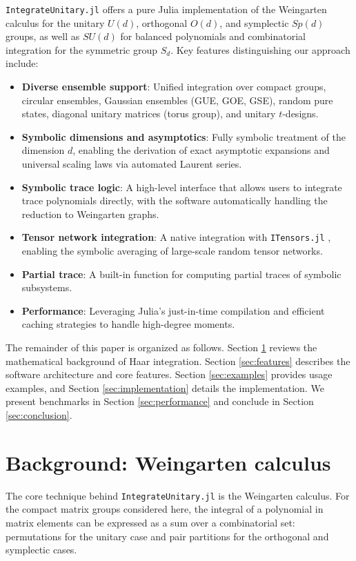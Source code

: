 \documentclass[manuscript,screen]{acmart}
\begin{document}
\texttt{IntegrateUnitary.jl} offers a pure Julia implementation of the Weingarten calculus
for the unitary $U(d)$, orthogonal $O(d)$, and
symplectic $Sp(d)$ groups, as well as $SU(d)$ for balanced polynomials and
combinatorial integration for the symmetric group $S_d$. Key features distinguishing our approach include:
\begin{itemize}
    \item \textbf{Diverse ensemble support}: Unified integration over compact
    groups, circular ensembles, Gaussian ensembles (GUE, GOE, GSE), random pure
    states, diagonal unitary matrices (torus group), and unitary $t$-designs.
    \item \textbf{Symbolic dimensions and asymptotics}: Fully symbolic treatment of
    the dimension $d$, enabling the derivation of exact asymptotic expansions and
    universal scaling laws via automated Laurent series.
    \item \textbf{Symbolic trace logic}: A high-level interface that allows users to
    integrate trace polynomials directly, with the software automatically handling
    the reduction to Weingarten graphs.
    \item \textbf{Tensor network integration}: A native integration with
    \texttt{ITensors.jl} \cite{fishman2022itensor}, enabling the symbolic
    averaging of large-scale random tensor networks.
    \item \textbf{Partial trace}: A built-in function for computing partial
    traces of symbolic subsystems.
    \item \textbf{Performance}: Leveraging Julia's just-in-time compilation and
    efficient caching strategies to handle high-degree moments.
\end{itemize}

The remainder of this paper is organized as follows. Section
\ref{sec:background} reviews the mathematical background of Haar integration.
Section \ref{sec:features} describes the software architecture and core
features. Section \ref{sec:examples} provides usage examples, and Section
\ref{sec:implementation} details the implementation. We present benchmarks in
Section \ref{sec:performance} and conclude in Section \ref{sec:conclusion}.

\section{Background: Weingarten calculus}
\label{sec:background}
The core technique behind \texttt{IntegrateUnitary.jl} is the Weingarten calculus. For the
compact matrix groups considered here, the integral of a polynomial in
matrix elements can be expressed as a sum over a combinatorial set:
permutations for the unitary case and pair partitions for the orthogonal and
symplectic cases.
\end{document}
